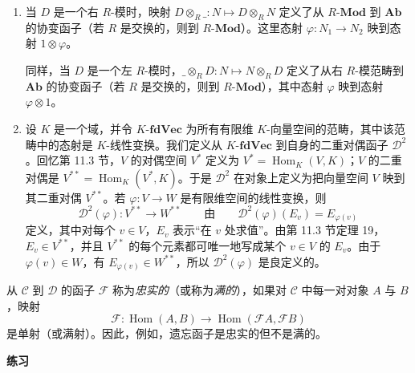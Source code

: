 \begin{enumerate}[label=(\arabic*)]
  \item 当 $D$ 是一个右 $R$-模时，映射 $D\otimes_R\_:N\mapsto D\otimes_R N$ 定义了从 $R\text{-}\mathbf{Mod}$ 到 $\mathbf{Ab}$ 的协变函子（若 $R$ 是交换的，则到 $R\text{-}\mathbf{Mod}$）。这里态射 $\varphi:N_1\to N_2$ 映到态射 $1\otimes\varphi$。

  同样，当 $D$ 是一个左 $R$-模时，$\_\otimes_R D:N\mapsto N\otimes_R D$ 定义了从右 $R$-模范畴到 $\mathbf{Ab}$ 的协变函子（若 $R$ 是交换的，则到 $R\text{-}\mathbf{Mod}$），其中态射 $\varphi$ 映到态射 $\varphi\otimes1$。

  \item 设 $K$ 是一个域，并令 $K\text{-}\mathbf{fdVec}$ 为所有有限维 $K$-向量空间的范畴，其中该范畴中的态射是 $K$-线性变换。我们定义从 $K\text{-}\mathbf{fdVec}$ 到自身的二重对偶函子 $\mathcal D^2$。回忆第 11.3 节，$V$ 的对偶空间 $V^*$ 定义为 $V^*=\operatorname{Hom}_K(V,K)$；$V$ 的二重对偶是 $V^{**}=\operatorname{Hom}_K(V^*,K)$。于是 $\mathcal D^2$ 在对象上定义为把向量空间 $V$ 映到其二重对偶 $V^{**}$。若 $\varphi:V\to W$ 是有限维空间的线性变换，则
  \[
    \mathcal D^2(\varphi):V^{**}\longrightarrow W^{**}
    \qquad\text{由}\qquad
    \mathcal D^2(\varphi)(E_v)=E_{\varphi(v)}
  \]
  定义，其中对每个 $v\in V$，$E_v$ 表示“在 $v$ 处求值”。由第 11.3 节定理 19，$E_v\in V^{**}$，并且 $V^{**}$ 的每个元素都可唯一地写成某个 $v\in V$ 的 $E_v$。由于 $\varphi(v)\in W$，有 $E_{\varphi(v)}\in W^{**}$，所以 $\mathcal D^2(\varphi)$ 是良定义的。
\end{enumerate}

从 $\mathcal C$ 到 $\mathcal D$ 的函子 $\mathcal F$ 称为\emph{忠实的}（或称为\emph{满的}），如果对 $\mathcal C$ 中每一对对象 $A$ 与 $B$，映射
\[
  \mathcal F:\operatorname{Hom}(A,B)\longrightarrow\operatorname{Hom}(\mathcal F A,\mathcal F B)
\]
是单射（或满射）。因此，例如，遗忘函子是忠实的但不是满的。

\begin{center}
\textbf{练习}
\end{center}

